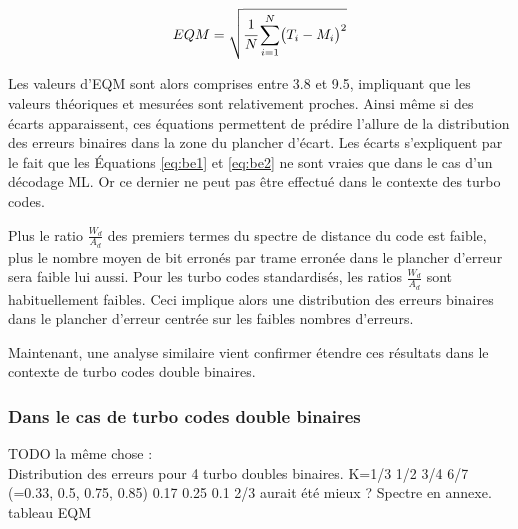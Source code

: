 \begin{equation}
	EQM = \sqrt{\cfrac{1}{N}\sum\limits_{i=1}^N\bigl(T_i-M_i\bigr)^2}
	\label{eq:eqm}
\end{equation}

Les valeurs d'EQM sont alors comprises entre 3.8 et 9.5, impliquant que les valeurs théoriques et mesurées sont 
relativement proches. Ainsi même si des écarts apparaissent, ces équations permettent de prédire l'allure de la distribution
des erreurs binaires dans la zone du plancher d'écart. Les écarts s'expliquent par le fait que les Équations \ref{eq:be1} 
et \ref{eq:be2} ne sont vraies que dans le cas d'un décodage ML. Or ce dernier ne peut pas être effectué dans le contexte des turbo codes.

Plus le ratio $\frac{W_d}{A_d}$ des premiers termes du spectre de distance du code est faible, plus le nombre moyen de 
bit erronés par trame erronée dans le plancher d'erreur sera faible lui aussi. Pour les turbo codes 
standardisés, les ratios $\frac{W_d}{A_d}$ sont habituellement faibles. Ceci implique alors une distribution des erreurs 
binaires dans le plancher d'erreur centrée sur les faibles nombres d'erreurs.
\begin{table}[b]
\centering
\caption{Erreur quadratique moyenne entre les valeurs théoriques et les simulations Monte-Carlo}
\label{tab:eqm}
\end{table}

Maintenant, une analyse similaire vient confirmer étendre ces résultats dans le contexte de turbo codes double binaires.

\subsubsection{Dans le cas de turbo codes double binaires}
TODO la même chose : \\
Distribution des erreurs pour 4 turbo doubles binaires. K=1/3 1/2 3/4 6/7 (=0.33, 0.5, 0.75, 0.85)
																			0.17    0.25   0.1  2/3 aurait été mieux ?	
Spectre en annexe.\\
tableau EQM\\



